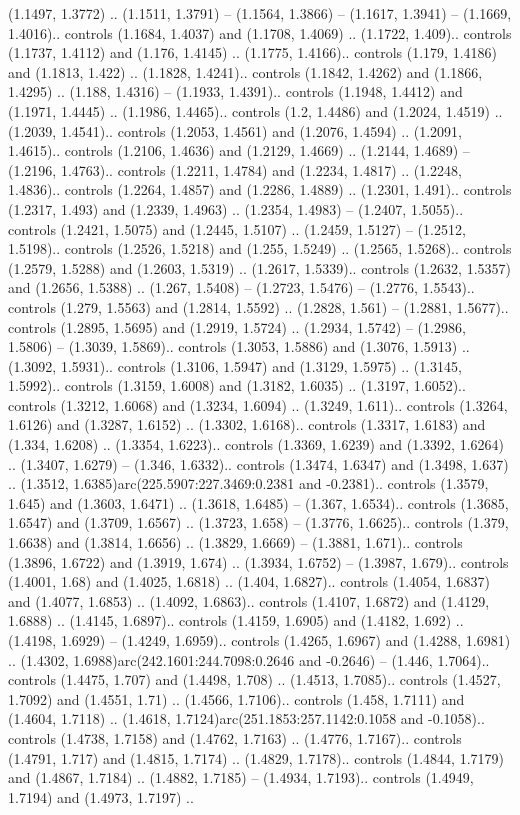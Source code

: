 (1.1497, 1.3772) .. (1.1511, 1.3791) -- (1.1564, 1.3866) -- (1.1617, 1.3941) -- (1.1669, 1.4016).. controls (1.1684, 1.4037) and (1.1708, 1.4069) .. (1.1722, 1.409).. controls (1.1737, 1.4112) and (1.176, 1.4145) .. (1.1775, 1.4166).. controls (1.179, 1.4186) and (1.1813, 1.422) .. (1.1828, 1.4241).. controls (1.1842, 1.4262) and (1.1866, 1.4295) .. (1.188, 1.4316) -- (1.1933, 1.4391).. controls (1.1948, 1.4412) and (1.1971, 1.4445) .. (1.1986, 1.4465).. controls (1.2, 1.4486) and (1.2024, 1.4519) .. (1.2039, 1.4541).. controls (1.2053, 1.4561) and (1.2076, 1.4594) .. (1.2091, 1.4615).. controls (1.2106, 1.4636) and (1.2129, 1.4669) .. (1.2144, 1.4689) -- (1.2196, 1.4763).. controls (1.2211, 1.4784) and (1.2234, 1.4817) .. (1.2248, 1.4836).. controls (1.2264, 1.4857) and (1.2286, 1.4889) .. (1.2301, 1.491).. controls (1.2317, 1.493) and (1.2339, 1.4963) .. (1.2354, 1.4983) -- (1.2407, 1.5055).. controls (1.2421, 1.5075) and (1.2445, 1.5107) .. (1.2459, 1.5127) -- (1.2512, 1.5198).. controls (1.2526, 1.5218) and (1.255, 1.5249) .. (1.2565, 1.5268).. controls (1.2579, 1.5288) and (1.2603, 1.5319) .. (1.2617, 1.5339).. controls (1.2632, 1.5357) and (1.2656, 1.5388) .. (1.267, 1.5408) -- (1.2723, 1.5476) -- (1.2776, 1.5543).. controls (1.279, 1.5563) and (1.2814, 1.5592) .. (1.2828, 1.561) -- (1.2881, 1.5677).. controls (1.2895, 1.5695) and (1.2919, 1.5724) .. (1.2934, 1.5742) -- (1.2986, 1.5806) -- (1.3039, 1.5869).. controls (1.3053, 1.5886) and (1.3076, 1.5913) .. (1.3092, 1.5931).. controls (1.3106, 1.5947) and (1.3129, 1.5975) .. (1.3145, 1.5992).. controls (1.3159, 1.6008) and (1.3182, 1.6035) .. (1.3197, 1.6052).. controls (1.3212, 1.6068) and (1.3234, 1.6094) .. (1.3249, 1.611).. controls (1.3264, 1.6126) and (1.3287, 1.6152) .. (1.3302, 1.6168).. controls (1.3317, 1.6183) and (1.334, 1.6208) .. (1.3354, 1.6223).. controls (1.3369, 1.6239) and (1.3392, 1.6264) .. (1.3407, 1.6279) -- (1.346, 1.6332).. controls (1.3474, 1.6347) and (1.3498, 1.637) .. (1.3512, 1.6385)arc(225.5907:227.3469:0.2381 and -0.2381).. controls (1.3579, 1.645) and (1.3603, 1.6471) .. (1.3618, 1.6485) -- (1.367, 1.6534).. controls (1.3685, 1.6547) and (1.3709, 1.6567) .. (1.3723, 1.658) -- (1.3776, 1.6625).. controls (1.379, 1.6638) and (1.3814, 1.6656) .. (1.3829, 1.6669) -- (1.3881, 1.671).. controls (1.3896, 1.6722) and (1.3919, 1.674) .. (1.3934, 1.6752) -- (1.3987, 1.679).. controls (1.4001, 1.68) and (1.4025, 1.6818) .. (1.404, 1.6827).. controls (1.4054, 1.6837) and (1.4077, 1.6853) .. (1.4092, 1.6863).. controls (1.4107, 1.6872) and (1.4129, 1.6888) .. (1.4145, 1.6897).. controls (1.4159, 1.6905) and (1.4182, 1.692) .. (1.4198, 1.6929) -- (1.4249, 1.6959).. controls (1.4265, 1.6967) and (1.4288, 1.6981) .. (1.4302, 1.6988)arc(242.1601:244.7098:0.2646 and -0.2646) -- (1.446, 1.7064).. controls (1.4475, 1.707) and (1.4498, 1.708) .. (1.4513, 1.7085).. controls (1.4527, 1.7092) and (1.4551, 1.71) .. (1.4566, 1.7106).. controls (1.458, 1.7111) and (1.4604, 1.7118) .. (1.4618, 1.7124)arc(251.1853:257.1142:0.1058 and -0.1058).. controls (1.4738, 1.7158) and (1.4762, 1.7163) .. (1.4776, 1.7167).. controls (1.4791, 1.717) and (1.4815, 1.7174) .. (1.4829, 1.7178).. controls (1.4844, 1.7179) and (1.4867, 1.7184) .. (1.4882, 1.7185) -- (1.4934, 1.7193).. controls (1.4949, 1.7194) and (1.4973, 1.7197) .. 